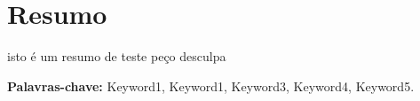 
\chapter*{Resumo}
\label{chapter:abstract_pt}
\vspace*{-10mm}

isto é um resumo de teste peço desculpa

\vfill

\begin{flushleft}
\textbf{Palavras-chave:}
Keyword1, Keyword1, Keyword3, Keyword4, Keyword5.
\end{flushleft}


